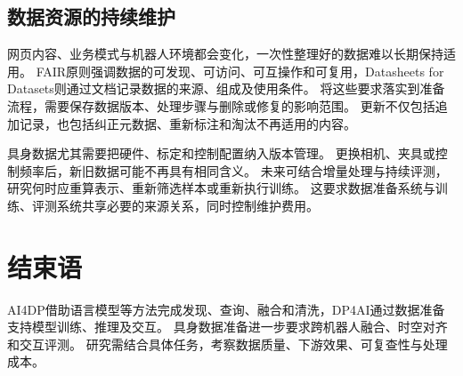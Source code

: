 \subsection{数据资源的持续维护}

网页内容、业务模式与机器人环境都会变化，一次性整理好的数据难以长期保持适用。
FAIR原则强调数据的可发现、可访问、可互操作和可复用，Datasheets for Datasets则通过文档记录数据的来源、组成及使用条件。\cite{fair,datasheets}
将这些要求落实到准备流程，需要保存数据版本、处理步骤与删除或修复的影响范围。
更新不仅包括追加记录，也包括纠正元数据、重新标注和淘汰不再适用的内容。

具身数据尤其需要把硬件、标定和控制配置纳入版本管理。
更换相机、夹具或控制频率后，新旧数据可能不再具有相同含义。
未来可结合增量处理与持续评测，研究何时应重算表示、重新筛选样本或重新执行训练。
这要求数据准备系统与训练、评测系统共享必要的来源关系，同时控制维护费用。

\section{结束语}

AI4DP借助语言模型等方法完成发现、查询、融合和清洗，DP4AI通过数据准备支持模型训练、推理及交互。
具身数据准备进一步要求跨机器人融合、时空对齐和交互评测。
研究需结合具体任务，考察数据质量、下游效果、可复查性与处理成本。
